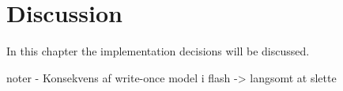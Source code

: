 \chapter{Discussion}
\label{chp:disc}

In this chapter the implementation decisions will be discussed.

noter
- Konsekvens af write-once model i flash -> langsomt at slette